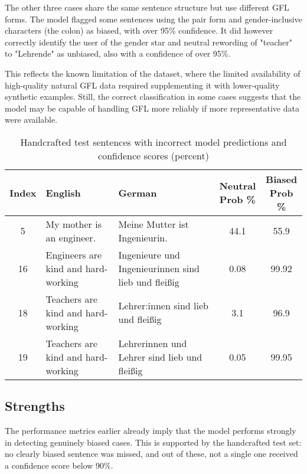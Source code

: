     The other three cases share the same sentence structure but use different GFL forms. The model flagged some sentences using the pair form and gender-inclusive characters (the colon) as biased, with over 95\% confidence. It did however correctly identify the user of the gender star and neutral rewording of "teacher" to "Lehrende" as unbiased, also with a confidence of over 95\%.
    
    This reflects the known limitation of the dataset, where the limited availability of high-quality natural GFL data required supplementing it with lower-quality synthetic examples. Still, the correct classification in some cases suggests that the model may be capable of handling GFL more reliably if more representative data were available.

    \vspace{0.8em}
        \begin{table}[ht]
        \centering
        \begin{tabular}{|c|p{5cm}|p{5cm}|c|c|}
        \hline
        \textbf{Index} & \textbf{English} & \textbf{German} & \makecell[c]{Neutral \\ Prob \%} & \makecell[c]{Biased \\ Prob \%} \\
        \hline
        5 & My mother is an engineer. & Meine Mutter ist Ingenieurin. & 44.1 & 55.9 \\
        16 & Engineers are kind and hard-working & Ingenieure und Ingenieurinnen sind lieb und fleißig & 0.08 & 99.92 \\
        18 & Teachers are kind and hard-working & Lehrer:innen sind lieb und fleißig & 3.1 & 96.9 \\
        19 & Teachers are kind and hard-working & Lehrerinnen und Lehrer sind lieb und fleißig & 0.05 & 99.95 \\
        \hline
        \end{tabular}
        \caption{Handcrafted test sentences with incorrect model predictions and confidence scores (percent)}
        \label{tab:false_positives_with_conf}
        \end{table}

\subsection{Strengths}
The performance metrics earlier already imply that the model performs strongly in detecting genuinely biased cases. This is supported by the handcrafted test set: no clearly biased sentence was missed, and out of these, not a single one received a confidence score below 90\%.

